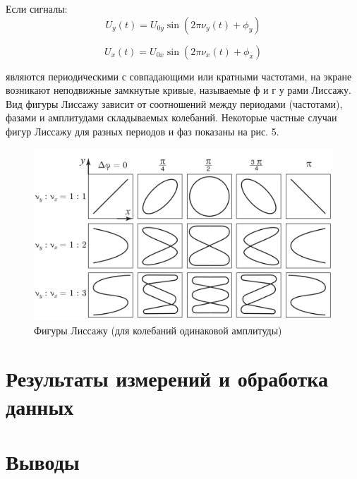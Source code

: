\documentclass[a4paper, 12pt]{article}
\begin{document}
Если сигналы:
\begin{equation}
    U_y(t)=U_{0y}\sin(2\pi\nu_y(t)+\phi_y)
\end{equation}

\begin{equation}
    U_x(t)=U_{0x}\sin(2\pi\nu_x(t)+\phi_x)
\end{equation}

являются периодическими с совпадающими или кратными частотами, на экране возникают неподвижные замкнутые кривые, называемые ф и г у рами Лиссажу. Вид фигуры Лиссажу зависит от соотношений между периодами (частотами), фазами и амплитудами складываемых колебаний. Некоторые частные случаи фигур Лиссажу для
разных периодов и фаз показаны на рис. 5.

\begin{figure}[h]
    \includegraphics[scale=0.7]{lissajous.png}
    \caption{Фигуры Лиссажу (для колебаний одинаковой амплитуды)}
    \label{fig:lissajous}
\end{figure}

\section{Результаты измерений и обработка данных}

\section{Выводы}
\end{document}
